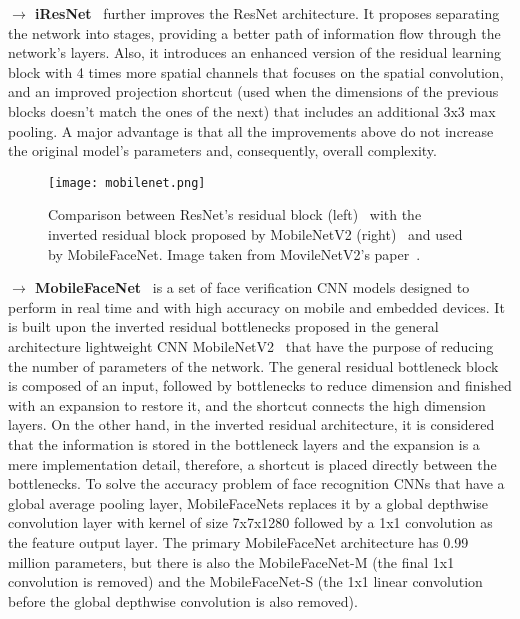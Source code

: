 \documentclass[class=report, crop=false, a4paper, 12pt]{standalone}
\begin{document}
\vspace{0.7\baselineskip}
\noindent\textbf{$\rightarrow$ iResNet}~\autocite{dutaImprovedResidualNetworks2021} further improves the ResNet architecture. It proposes separating the network into stages, providing a better path of information flow through the network's layers. Also, it introduces an enhanced version of the residual learning block with 4 times more spatial channels that focuses on the spatial convolution, and an improved projection shortcut (used when the dimensions of the previous blocks doesn't match the ones of the next) that includes an additional 3x3 max pooling. A major advantage is that all the improvements above do not increase the original model's parameters and, consequently, overall complexity.

\vspace{0.7\baselineskip}
\begin{figure}[H]
    \centering
    \texttt{[image: mobilenet.png]}
    \caption{Comparison between ResNet's residual block (left)~\autocite{chenMobileFaceNetsEfficientCNNs2018} with the inverted residual block proposed by MobileNetV2 (right)~\autocite{sandlerMobileNetV2InvertedResiduals2019} and used by MobileFaceNet. Image taken from MovileNetV2's paper~\autocite{sandlerMobileNetV2InvertedResiduals2019}.}
    \label{fig:mobilefacenet}
\end{figure}

\label{mobilefacenet}
\noindent\textbf{$\rightarrow$ MobileFaceNet}~\autocite{chenMobileFaceNetsEfficientCNNs2018} is a set of face verification CNN models designed to perform in real time and with high accuracy on mobile and embedded devices. It is built upon the inverted residual bottlenecks  proposed in the general architecture lightweight CNN MobileNetV2~\autocite{sandlerMobileNetV2InvertedResiduals2019} that have the purpose of reducing the number of parameters of the network. The general residual bottleneck block~\autocite{heDeepResidualLearning2016} is composed of an input, followed by bottlenecks to reduce dimension and finished with an expansion to restore it, and the shortcut connects the high dimension layers. On the other hand, in the inverted residual architecture, it is considered that the information is stored in the bottleneck layers and the expansion is a mere implementation detail, therefore, a shortcut is placed directly between the bottlenecks. To solve the accuracy problem of face recognition CNNs that have a global average pooling layer, MobileFaceNets replaces it by a global depthwise convolution layer with kernel of size 7x7x1280 followed by a 1x1 convolution as the feature output layer. The primary MobileFaceNet architecture has 0.99 million parameters, but there is also the MobileFaceNet-M (the final 1x1 convolution is removed) and the MobileFaceNet-S (the 1x1 linear convolution before the global depthwise convolution is also removed).
\end{document}
